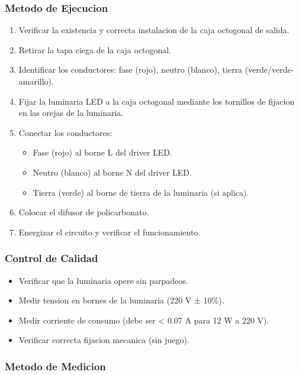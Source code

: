 \subsubsection{Metodo de Ejecucion}

\begin{enumerate}
  \item Verificar la existencia y correcta instalacion de la caja octogonal de salida.
  \item Retirar la tapa ciega de la caja octogonal.
  \item Identificar los conductores: fase (rojo), neutro (blanco), tierra (verde/verde-amarillo).
  \item Fijar la luminaria LED a la caja octogonal mediante los tornillos de fijacion en las orejas de la luminaria.
  \item Conectar los conductores:
  \begin{itemize}
    \item Fase (rojo) al borne L del driver LED.
    \item Neutro (blanco) al borne N del driver LED.
    \item Tierra (verde) al borne de tierra de la luminaria (si aplica).
  \end{itemize}
  \item Colocar el difusor de policarbonato.
  \item Energizar el circuito y verificar el funcionamiento.
\end{enumerate}

\subsubsection{Control de Calidad}

\begin{itemize}
  \item Verificar que la luminaria opere sin parpadeos.
  \item Medir tension en bornes de la luminaria (220 V ± 10\%).
  \item Medir corriente de consumo (debe ser < 0.07 A para 12 W a 220 V).
  \item Verificar correcta fijacion mecanica (sin juego).
\end{itemize}

\subsubsection{Metodo de Medicion}

